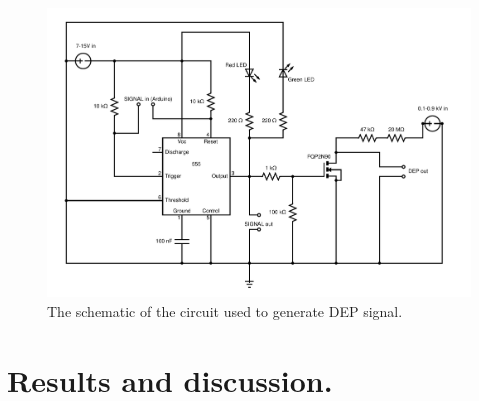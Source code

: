 \documentclass[final]{jyflluk}
\begin{document}
\begin{figure}
    \centering
    \includegraphics[width=1.0\textwidth]{images/circuit.pdf}
    \caption{The schematic of the circuit used to generate DEP signal.}
    \label{fig:circuit}
\end{figure}

\section{Results and discussion.}
\label{sec:results}
\end{document}
